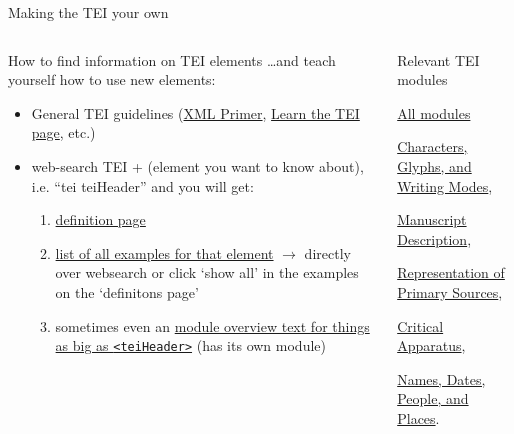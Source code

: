\begin{frame}[allowframebreaks]{Making the TEI your own}
\small
{}

\begin{columns}
    \begin{block}{How to find information on TEI elements}
    \dots and teach yourself how to use new elements:
\begin{itemize}\footnotesize
    \item General TEI guidelines (\href{https://tei-c.org/release/doc/tei-p5-doc/en/html/SG.html}{XML Primer}, \href{https://tei-c.org/support/learn/}{Learn the TEI page}, etc.)
    \item web-search TEI + (element you want to know about), i.e. ``tei teiHeader'' and you will get:
    \begin{enumerate}\scriptsize
        \item \href{https://www.tei-c.org/release/doc/tei-p5-doc/en/html/ref-teiHeader.html}{definition page}
        \item \href{https://www.tei-c.org/release/doc/tei-p5-doc/en/html/examples-teiHeader.html}{list of all examples for that element} $\to$ directly over websearch or click `show all' in the examples on the `definitons page'
        \item sometimes even an \href{https://www.tei-c.org/release/doc/tei-p5-doc/en/html/HD.html}{module overview text for things as big as \texttt{<teiHeader>}} (has its own module)
    \end{enumerate}
\end{itemize}
    \end{block}



\begin{block}{Relevant TEI modules}
\begin{description}\scriptsize
    \item[all] \href{https://tei-c.org/release/doc/tei-p5-doc/en/html/index.html}{All modules}
     \item[5] \href{https://tei-c.org/release/doc/tei-p5-doc/en/html/WD.html}{Characters, Glyphs, and Writing Modes}, 
     \item[10] \href{https://www.tei-c.org/release/doc/tei-p5-doc/en/html/MS.html}{Manuscript Description},
     \item[11] \href{https://tei-c.org/release/doc/tei-p5-doc/en/html/PH.html}{Representation of Primary Sources},
     \item[12] \href{https://tei-c.org/release/doc/tei-p5-doc/en/html/TC.html}{Critical Apparatus},
     \item[13] \href{https://tei-c.org/release/doc/tei-p5-doc/en/html/ND.html}{Names, Dates, People, and Places}.
\end{description}
\end{block}


\end{columns}
\end{frame}
